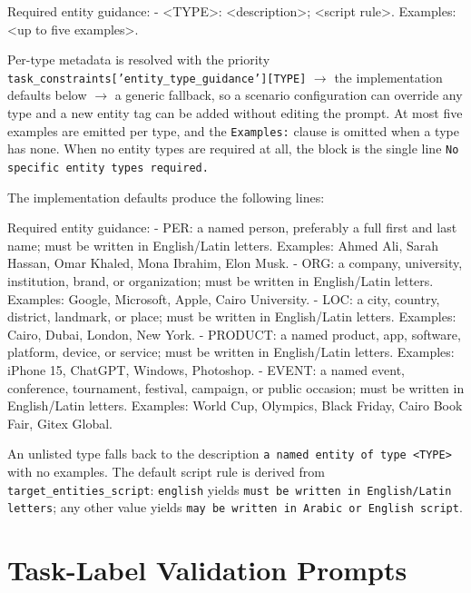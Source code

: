 \begin{Prompt}
Required entity guidance:
- <TYPE>: <description>; <script rule>. Examples: <up to five examples>.
\end{Prompt}

\noindent
Per-type metadata is resolved with the priority
\texttt{task\_constraints['entity\_type\_guidance'][TYPE]} $\rightarrow$
the implementation defaults below $\rightarrow$ a generic fallback, so a
scenario configuration can override any type and a new entity tag can be added
without editing the prompt. At most five examples are emitted per type, and the
\texttt{Examples:} clause is omitted when a type has none. When no entity types
are required at all, the block is the single line
\texttt{No specific entity types required.}

The implementation defaults produce the following lines:

\begin{Prompt}
Required entity guidance:
- PER: a named person, preferably a full first and last name; must be written in English/Latin letters. Examples: Ahmed Ali, Sarah Hassan, Omar Khaled, Mona Ibrahim, Elon Musk.
- ORG: a company, university, institution, brand, or organization; must be written in English/Latin letters. Examples: Google, Microsoft, Apple, Cairo University.
- LOC: a city, country, district, landmark, or place; must be written in English/Latin letters. Examples: Cairo, Dubai, London, New York.
- PRODUCT: a named product, app, software, platform, device, or service; must be written in English/Latin letters. Examples: iPhone 15, ChatGPT, Windows, Photoshop.
- EVENT: a named event, conference, tournament, festival, campaign, or public occasion; must be written in English/Latin letters. Examples: World Cup, Olympics, Black Friday, Cairo Book Fair, Gitex Global.
\end{Prompt}

\noindent
An unlisted type falls back to the description
\texttt{a named entity of type <TYPE>} with no examples. The default script
rule is derived from \texttt{target\_entities\_script}:
\texttt{english} yields \texttt{must be written in English/Latin letters}; any
other value yields \texttt{may be written in Arabic or English script}.


\section{Task-Label Validation Prompts}
\label{app:prompts:task-validation}

